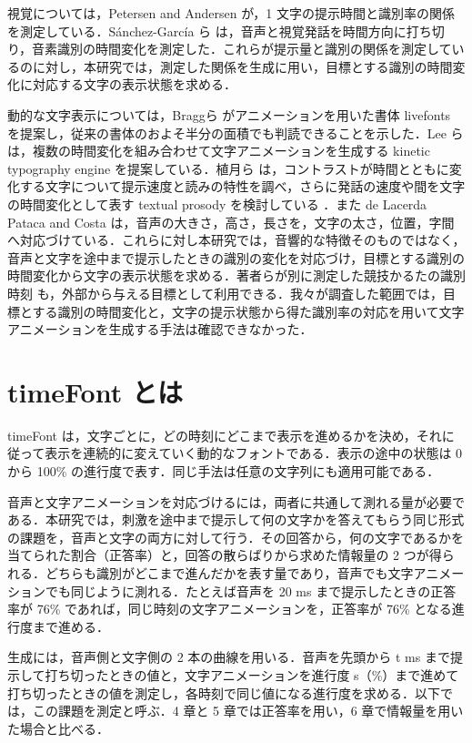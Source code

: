 視覚については，Petersen and Andersen \cite{petersen} が，1 文字の提示時間と識別率の関係を測定している．Sánchez-García ら \cite{sanchez} は，音声と視覚発話を時間方向に打ち切り，音素識別の時間変化を測定した．これらが提示量と識別の関係を測定しているのに対し，本研究では，測定した関係を生成に用い，目標とする識別の時間変化に対応する文字の表示状態を求める．

動的な文字表示については，Braggら\cite{bragg} がアニメーションを用いた書体 livefonts を提案し，従来の書体のおよそ半分の面積でも判読できることを示した．Lee ら \cite{lee} は，複数の時間変化を組み合わせて文字アニメーションを生成する kinetic typography engine を提案している．植月ら \cite{uetsuki17} は，コントラストが時間とともに変化する文字について提示速度と読みの特性を調べ，さらに発話の速度や間を文字の時間変化として表す textual prosody を検討している \cite{uetsuki20}．また de Lacerda Pataca and Costa \cite{pataca} は，音声の大きさ，高さ，長さを，文字の太さ，位置，字間へ対応づけている．これらに対し本研究では，音響的な特徴そのものではなく，音声と文字を途中まで提示したときの識別の変化を対応づけ，目標とする識別の時間変化から文字の表示状態を求める．著者らが別に測定した競技かるたの識別時刻 \cite{maruyama} も，外部から与える目標として利用できる．我々が調査した範囲では，目標とする識別の時間変化と，文字の提示状態から得た識別率の対応を用いて文字アニメーションを生成する手法は確認できなかった．


\section{timeFont とは}

timeFont は，文字ごとに，どの時刻にどこまで表示を進めるかを決め，それに従って表示を連続的に変えていく動的なフォントである．表示の途中の状態は 0 から 100\% の進行度で表す．同じ手法は任意の文字列にも適用可能である．

音声と文字アニメーションを対応づけるには，両者に共通して測れる量が必要である．本研究では，刺激を途中まで提示して何の文字かを答えてもらう同じ形式の課題を，音声と文字の両方に対して行う．その回答から，何の文字であるかを当てられた割合（正答率）と，回答の散らばりから求めた情報量の 2 つが得られる．どちらも識別がどこまで進んだかを表す量であり，音声でも文字アニメーションでも同じように測れる．たとえば音声を 20 ms まで提示したときの正答率が 76\% であれば，同じ時刻の文字アニメーションを，正答率が 76\% となる進行度まで進める．

生成には，音声側と文字側の 2 本の曲線を用いる．音声を先頭から t ms まで提示して打ち切ったときの値と，文字アニメーションを進行度 s（\%）まで進めて打ち切ったときの値を測定し，各時刻で同じ値になる進行度を求める．以下では，この課題を測定と呼ぶ．4 章と 5 章では正答率を用い，6 章で情報量を用いた場合と比べる．

